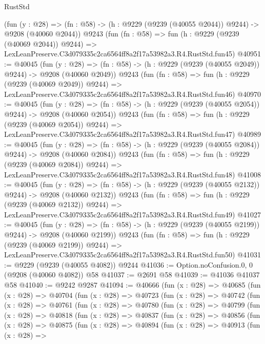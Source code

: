 \begin{lexlean}{RustStd}
\begin{coremodule}
    (fun (y : @28) =>
    (fn : @58) -> (h : @9229 (@9239 (@40055 @2044)) @9244) -> @9208 (@40060 @2044))
    @9243
    (fun (fn : @58) =>
    fun (h : @9229 (@9239 (@40069 @2044)) @9244) =>
    LexLeanPreserve.C3d079335c2ca6564ff8a2f17a53982a3.R4.RustStd.fun45)
@40951 := @40045
    (fun (y : @28) =>
    (fn : @58) -> (h : @9229 (@9239 (@40055 @2049)) @9244) -> @9208 (@40060 @2049))
    @9243
    (fun (fn : @58) =>
    fun (h : @9229 (@9239 (@40069 @2049)) @9244) =>
    LexLeanPreserve.C3d079335c2ca6564ff8a2f17a53982a3.R4.RustStd.fun46)
@40970 := @40045
    (fun (y : @28) =>
    (fn : @58) -> (h : @9229 (@9239 (@40055 @2054)) @9244) -> @9208 (@40060 @2054))
    @9243
    (fun (fn : @58) =>
    fun (h : @9229 (@9239 (@40069 @2054)) @9244) =>
    LexLeanPreserve.C3d079335c2ca6564ff8a2f17a53982a3.R4.RustStd.fun47)
@40989 := @40045
    (fun (y : @28) =>
    (fn : @58) -> (h : @9229 (@9239 (@40055 @2084)) @9244) -> @9208 (@40060 @2084))
    @9243
    (fun (fn : @58) =>
    fun (h : @9229 (@9239 (@40069 @2084)) @9244) =>
    LexLeanPreserve.C3d079335c2ca6564ff8a2f17a53982a3.R4.RustStd.fun48)
@41008 := @40045
    (fun (y : @28) =>
    (fn : @58) -> (h : @9229 (@9239 (@40055 @2132)) @9244) -> @9208 (@40060 @2132))
    @9243
    (fun (fn : @58) =>
    fun (h : @9229 (@9239 (@40069 @2132)) @9244) =>
    LexLeanPreserve.C3d079335c2ca6564ff8a2f17a53982a3.R4.RustStd.fun49)
@41027 := @40045
    (fun (y : @28) =>
    (fn : @58) -> (h : @9229 (@9239 (@40055 @2199)) @9244) -> @9208 (@40060 @2199))
    @9243
    (fun (fn : @58) =>
    fun (h : @9229 (@9239 (@40069 @2199)) @9244) =>
    LexLeanPreserve.C3d079335c2ca6564ff8a2f17a53982a3.R4.RustStd.fun50)
@41031 := @9229 (@9239 (@40055 @4082)) @9244
@41036 := Option.noConfusion.{0, 0} (@9208 (@40060 @4082)) @58
@41037 := @2691 @58
@41039 := @41036 @41037 @58
@41040 := @9242 @9287
@41094 := @40666
    (fun (x : @28) =>
    @40685
      (fun (x : @28) =>
      @40704
        (fun (x : @28) =>
        @40723
          (fun (x : @28) =>
          @40742
            (fun (x : @28) =>
            @40761
              (fun (x : @28) =>
              @40780
                (fun (x : @28) =>
                @40799
                  (fun (x : @28) =>
                  @40818
                    (fun (x : @28) =>
                    @40837
                      (fun (x : @28) =>
                      @40856
                        (fun (x : @28) =>
                        @40875
                          (fun (x : @28) =>
                          @40894
                            (fun (x : @28) =>
                            @40913
                              (fun (x : @28) =>

\end{coremodule}
\end{lexlean}
